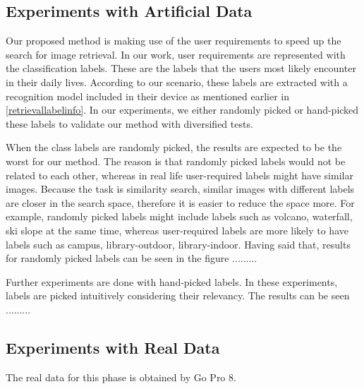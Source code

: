 \subsection*{Experiments with Artificial Data}

Our proposed method is making use of the user requirements to speed up the search for image retrieval. 
In our work, user requirements are represented with the classification labels. 
These are the labels that the users most likely encounter in their daily lives. 
According to our scenario, these labels are extracted with a recognition model included in their device as mentioned earlier in \ref{retrievallabelinfo}. 
In our experiments, we either randomly picked or hand-picked these labels to validate our method with diversified tests.

When the class labels are randomly picked, the results are expected to be the worst for our method. 
The reason is that randomly picked labels would not be related to each other, whereas in real life user-required labels might have similar images. 
Because the task is similarity search, similar images with different labels are closer in the search space, therefore it is easier to reduce the space more.
For example, randomly picked labels might include labels such as volcano, waterfall, ski slope at the same time, whereas user-required labels are more likely to have labels such as campus, library-outdoor, library-indoor.
Having said that, results for randomly picked labels can be seen in the figure .........

Further experiments are done with hand-picked labels. 
In these experiments, labels are picked intuitively considering their relevancy. 
The results can be seen .........

\subsection*{Experiments with Real Data}

The real data for this phase is obtained by Go Pro 8.

